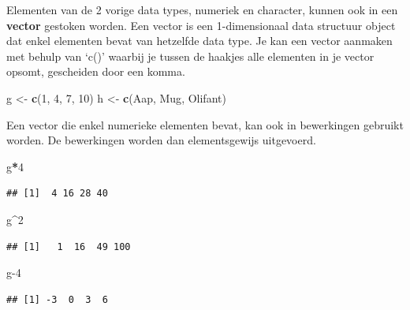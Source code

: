 \documentclass[
]{book}
\newenvironment{Shaded}{\begin{snugshade}}{\end{snugshade}}
\newcommand{\DecValTok}[1]{\textcolor[rgb]{0.00,0.00,0.81}{#1}}
\newcommand{\FunctionTok}[1]{\textcolor[rgb]{0.13,0.29,0.53}{\textbf{#1}}}
\newcommand{\NormalTok}[1]{#1}
\newcommand{\OtherTok}[1]{\textcolor[rgb]{0.56,0.35,0.01}{#1}}
\newcommand{\SpecialCharTok}[1]{\textcolor[rgb]{0.81,0.36,0.00}{\textbf{#1}}}
\newcommand{\StringTok}[1]{\textcolor[rgb]{0.31,0.60,0.02}{#1}}
\begin{document}
Elementen van de 2 vorige data types, numeriek en character, kunnen ook in een
\textbf{vector} gestoken worden. Een vector is een 1-dimensionaal data structuur object dat enkel elementen bevat van hetzelfde data type. Je kan een vector aanmaken met behulp van `c()' waarbij je tussen de haakjes alle elementen in je vector opsomt, gescheiden door een komma.

\begin{Shaded}
\begin{Highlighting}[]
\NormalTok{g }\OtherTok{\textless{}{-}} \FunctionTok{c}\NormalTok{(}\DecValTok{1}\NormalTok{, }\DecValTok{4}\NormalTok{, }\DecValTok{7}\NormalTok{, }\DecValTok{10}\NormalTok{)}
\NormalTok{h }\OtherTok{\textless{}{-}} \FunctionTok{c}\NormalTok{(}\StringTok{\textquotesingle{}Aap\textquotesingle{}}\NormalTok{, }\StringTok{\textquotesingle{}Mug\textquotesingle{}}\NormalTok{, }\StringTok{\textquotesingle{}Olifant\textquotesingle{}}\NormalTok{)}
\end{Highlighting}
\end{Shaded}

Een vector die enkel numerieke elementen bevat, kan ook in bewerkingen gebruikt worden.
De bewerkingen worden dan elementsgewijs uitgevoerd.

\begin{Shaded}
\begin{Highlighting}[]
\NormalTok{g}\SpecialCharTok{*}\DecValTok{4}
\end{Highlighting}
\end{Shaded}

\begin{verbatim}
## [1]  4 16 28 40
\end{verbatim}

\begin{Shaded}
\begin{Highlighting}[]
\NormalTok{g}\SpecialCharTok{\^{}}\DecValTok{2}
\end{Highlighting}
\end{Shaded}

\begin{verbatim}
## [1]   1  16  49 100
\end{verbatim}

\begin{Shaded}
\begin{Highlighting}[]
\NormalTok{g}\DecValTok{{-}4}
\end{Highlighting}
\end{Shaded}

\begin{verbatim}
## [1] -3  0  3  6
\end{verbatim}
\end{document}
